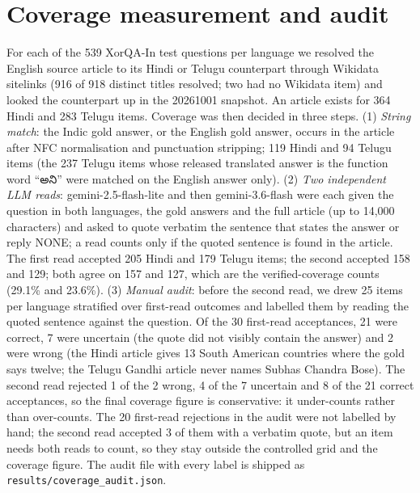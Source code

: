 \clearpage
\appendix

\section{Coverage measurement and audit}
\label{app:coverage}
For each of the 539 XorQA-In test questions per language we resolved the English source article to its Hindi or Telugu counterpart through Wikidata sitelinks (916 of 918 distinct titles resolved; two had no Wikidata item) and looked the counterpart up in the 20261001 snapshot. An article exists for 364 Hindi and 283 Telugu items. Coverage was then decided in three steps. (1) \emph{String match}: the Indic gold answer, or the English gold answer, occurs in the article after NFC normalisation and punctuation stripping; 119 Hindi and 94 Telugu items (the 237 Telugu items whose released translated answer is the function word ``{\telu అని}'' were matched on the English answer only). (2) \emph{Two independent LLM reads}: gemini-2.5-flash-lite and then gemini-3.6-flash were each given the question in both languages, the gold answers and the full article (up to 14,000 characters) and asked to quote verbatim the sentence that states the answer or reply NONE; a read counts only if the quoted sentence is found in the article. The first read accepted 205 Hindi and 179 Telugu items; the second accepted 158 and 129; both agree on 157 and 127, which are the verified-coverage counts (29.1\% and 23.6\%). (3) \emph{Manual audit}: before the second read, we drew 25 items per language stratified over first-read outcomes and labelled them by reading the quoted sentence against the question. Of the 30 first-read acceptances, 21 were correct, 7 were uncertain (the quote did not visibly contain the answer) and 2 were wrong (the Hindi article gives 13 South American countries where the gold says twelve; the Telugu Gandhi article never names Subhas Chandra Bose). The second read rejected 1 of the 2 wrong, 4 of the 7 uncertain and 8 of the 21 correct acceptances, so the final coverage figure is conservative: it under-counts rather than over-counts. The 20 first-read rejections in the audit were not labelled by hand; the second read accepted 3 of them with a verbatim quote, but an item needs both reads to count, so they stay outside the controlled grid and the coverage figure. The audit file with every label is shipped as \texttt{results/coverage\_audit.json}.
